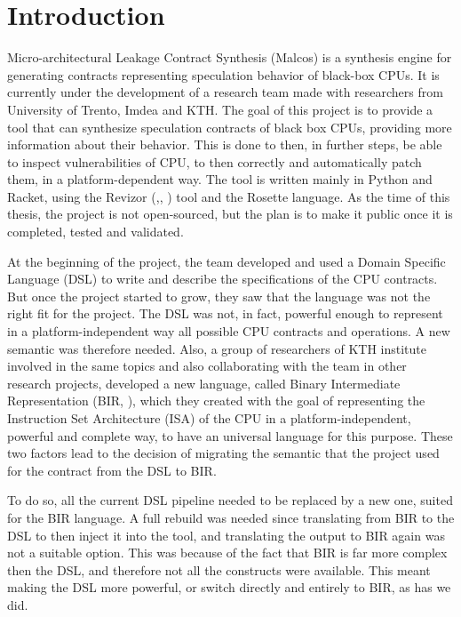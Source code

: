 \chapter{Introduction}
\label{cha:introduction}

Micro-architectural Leakage Contract Synthesis (Malcos) is a synthesis engine
for generating contracts representing speculation behavior of black-box CPUs. It
is currently under the development of a research team made with researchers from
University of Trento, Imdea and KTH. The goal of this project is to provide a tool
that can synthesize speculation contracts of black box CPUs, providing more
information about their behavior. This is done to then, in further steps, be able
to inspect vulnerabilities of CPU, to then correctly and automatically patch
them, in a platform-dependent way. The tool is written mainly in Python and
Racket, using the Revizor (\cite{article},\cite{repo}, \cite{misc}) tool and the
Rosette language\cite{ros}. As the time of this thesis, the project is not open-sourced,
but the plan is to make it public once it is completed, tested and validated.

At the beginning of the project, the team developed and used a Domain Specific
Language (DSL) to write and describe the specifications of the CPU contracts. But
once the project started to grow, they saw that the language was not the right
fit for the project. The DSL was not, in fact, powerful enough to represent in a
platform-independent way all possible CPU contracts and operations. A new
semantic was therefore needed. Also, a group of researchers of KTH institute
involved in the same topics and also collaborating with the team in other
research projects, developed a new language, called Binary Intermediate
Representation (BIR, \cite{bir_pub}), which they created with the goal of
representing the Instruction Set Architecture (ISA) of the CPU in a platform-independent,
powerful and complete way, to have an universal language for this purpose. These
two factors lead to the decision of migrating the semantic that the project used
for the contract from the DSL to BIR.

To do so, all the current DSL pipeline needed to be replaced by a new one, suited
for the BIR language. A full rebuild was needed since translating from BIR to
the DSL to then inject it into the tool, and translating the output to BIR again
was not a suitable option. This was because of the fact that BIR is far more
complex then the DSL, and therefore not all the constructs were available. This
meant making the DSL more powerful, or switch directly and entirely to BIR, as
has we did.

